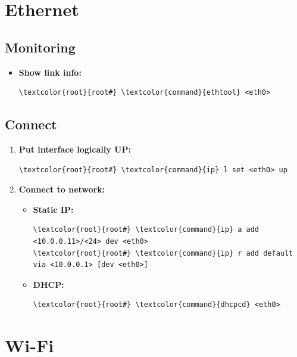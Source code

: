 \documentclass[10pt, a4paper, onecolumn, oneside, titlepage, openany]{book}
\begin{document}
\section{Ethernet}
\subsection{Monitoring}
\begin{itemize}
    \item \textbf{Show link info:}
\begin{Verbatim}[commandchars=\\\{\}]
\textcolor{root}{root#} \textcolor{command}{ethtool} <eth0>
\end{Verbatim}
\end{itemize}
\subsection{Connect}
\begin{enumerate}
    \item \textbf{Put interface logically UP:}
\begin{Verbatim}[commandchars=\\\{\}]
\textcolor{root}{root#} \textcolor{command}{ip} l set <eth0> up
\end{Verbatim}
    \item \textbf{Connect to network:}
    \begin{itemize}
        \item \textbf{Static IP:}
\begin{Verbatim}[commandchars=\\\{\}]
\textcolor{root}{root#} \textcolor{command}{ip} a add <10.0.0.11>/<24> dev <eth0>
\textcolor{root}{root#} \textcolor{command}{ip} r add default via <10.0.0.1> [dev <eth0>]
\end{Verbatim}
        \item \textbf{DHCP:}
\begin{Verbatim}[commandchars=\\\{\}]
\textcolor{root}{root#} \textcolor{command}{dhcpcd} <eth0>
\end{Verbatim}
    \end{itemize}
\end{enumerate}

\section{Wi-Fi}
\end{document}
